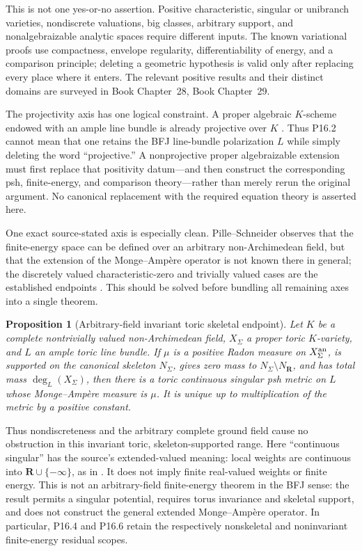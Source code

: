 \documentclass[11pt,a4paper]{article}
\newtheorem{proposition}[proposition]{Proposition}
\theoremstyle{definition}
\theoremstyle{remark}
\begin{document}
This is not one yes-or-no assertion.  Positive characteristic, singular or
unibranch varieties, nondiscrete valuations, big classes, arbitrary support,
and nonalgebraizable analytic spaces require different inputs.  The known
variational proofs use compactness, envelope regularity, differentiability of
energy, and a comparison principle; deleting a geometric hypothesis is valid
only after replacing every place where it enters.  The relevant positive
results and their distinct domains are surveyed in
Book Chapter~28, Book Chapter~29.

The projectivity axis has one logical constraint.  A proper algebraic
\(K\)-scheme endowed with an ample line bundle is already projective over
\(K\) \cite[Tag~0B5N]{StacksProject}.  Thus P16.2 cannot mean that one
retains the BFJ line-bundle polarization \(L\) while simply deleting the word
``projective.''  A nonprojective proper algebraizable extension must first
replace that positivity datum---and then construct the corresponding psh,
finite-energy, and comparison theory---rather than merely rerun the original
argument.  No canonical replacement with the required equation theory is
asserted here.

One exact source-stated axis is especially clean.  Pille--Schneider observes
that the finite-energy space can be defined over an arbitrary
non-Archimedean field, but that the extension of the Monge--Amp\`ere operator
is not known there in general; the discretely valued characteristic-zero and
trivially valued cases are the established endpoints
\cite[Remark~4.4]{PS23Hybrid}.  This should be solved before bundling all
remaining axes into a single theorem.

\begin{proposition}[Arbitrary-field invariant toric skeletal endpoint]
\label{prop:p164-arbitrary-field-toric-skeletal-endpoint}
Let \(K\) be a complete nontrivially valued non-Archimedean field,
\(X_\Sigma\) a proper toric \(K\)-variety, and \(L\) an ample toric line
bundle.  If \(\mu\) is a positive Radon measure on \(X_\Sigma^{\mathrm{an}}\), is
supported on the canonical skeleton \(N_\Sigma\), gives zero mass to
\(N_\Sigma\setminus N_{\mathbf R}\), and has total mass
\(\deg_L(X_\Sigma)\), then there is a toric continuous singular psh metric
on \(L\) whose Monge--Amp\`ere measure is \(\mu\).  It is unique up to
multiplication of the metric by a positive constant.
\end{proposition}



Thus nondiscreteness and the arbitrary complete ground field cause no
obstruction in this invariant toric, skeleton-supported range.
Here ``continuous singular'' has the source's extended-valued meaning:
local weights are continuous into \(\mathbf R\cup\{-\infty\}\), as in
\cite[\S5.3.1]{BGJKK25}.  It does not imply finite real-valued weights or
finite energy.  This is not an arbitrary-field finite-energy theorem in the
BFJ sense: the result permits
a singular potential, requires torus invariance and skeletal support, and
does not construct the general extended Monge--Amp\`ere operator.  In
particular, P16.4 and P16.6 retain the respectively nonskeletal and
noninvariant finite-energy residual scopes.
\end{document}
